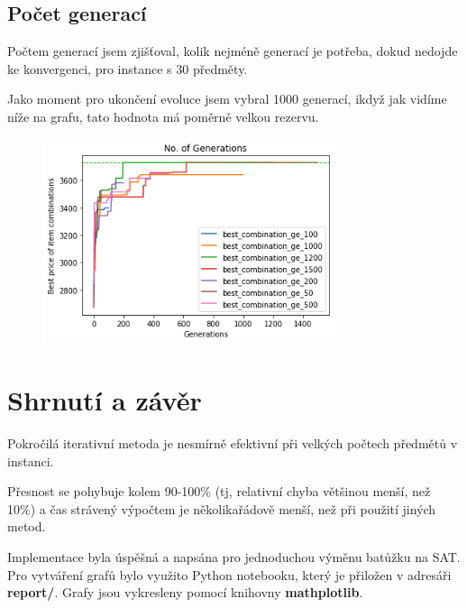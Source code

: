 \documentclass[a4paper,10pt,twocolumn]{article}
\begin{document}
\begin{itemize}
\begin{itemize}
\subsection{Počet generací}

Počtem generací jsem zjišťoval, kolik nejméně generací je potřeba, dokud nedojde ke konvergenci, pro instance s 30 předměty.

Jako moment pro ukončení evoluce jsem vybral 1000 generací, ikdyž jak vidíme níže na grafu, tato hodnota má poměrně velkou rezervu.


\begin{figure}[H]
  \begin{center}
    \includegraphics[height=6cm]{graphs/generations.png}
  \end{center}
\end{figure}


\section{Shrnutí a závěr}

Pokročilá iterativní metoda je nesmírně efektivní při velkých počtech předmětů v instanci.

Přesnost se pohybuje kolem 90-100\% (tj, relativní chyba většinou menší, než 10\%) a čas strávený výpočtem je několikařádově menší, než při použití jiných metod.

Implementace byla úspěšná a napsána pro jednoduchou výměnu batůžku  na SAT. \\
Pro vytváření grafů bylo využito Python notebooku, který je přiložen v adresáři \textbf{report/}. Grafy jsou vykresleny pomocí knihovny \textbf{mathplotlib}.



\end{itemize}
\end{itemize}
\end{document}
